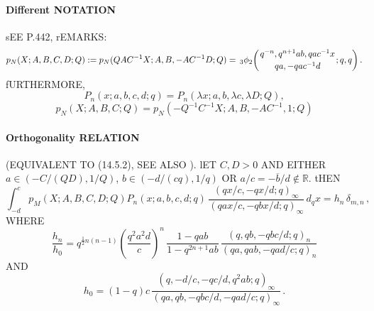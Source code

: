 \documentclass[twoside,11pt]{article}
\newcommand\RR{\mathbb{R}}
\newcommand\de\delta
\newcommand\la\lambda
\newcommand\half{\frac12}
\newcommand\iy\infty
\newcommand{\qhyp}[5]{\,\mbox{}_{#1}\phi_{#2}\!\left( 
  \genfrac{}{}{0pt}{}{#3}{#4};#5\right)}
\begin{document}
\paragraph{Different NOTATION} 
sEE P.442, rEMARKS: 
\begin{equation} 
p_N(X;A,B,C,D;Q):=p_N(QAC^{-1}X;A,B,-AC^{-1}D;Q) 
=\qhyp32{q^{-n},q^{n+1}ab,qac^{-1}x}{qa,-qac^{-1}d}{q,q}. 
\label{123} 
\end{equation} 
fURTHERMORE, 
\begin{equation} 
P_n(x;a,b,c,d;q)=P_n(\la x;a,b,\la c,\la D;Q), 
\label{141} 
\end{equation} 
\begin{equation} 
p_N(X;A,B,C;Q)=p_N(-Q^{-1}C^{-1}X;A,B,-AC^{-1},1;Q) 
\label{142} 
\end{equation} 
% 
\paragraph{Orthogonality RELATION} 
(EQUIVALENT TO (14.5.2), SEE ALSO \cite[(2.42), (2.41), (2.36), (2.35)]{k17}). 
lET $C,D>0$ AND EITHER $a\in (-C/(QD),1/Q)$, $b\in(-d/(cq),1/q)$ OR 
$a/c=-\overline b/d\notin\RR$. tHEN 
\begin{equation} 
\int_{-d}^c p_M(X;A,B,C,D;Q) P_n(x;a,b,c,d;q)\, 
\frac{(qx/c,-qx/d;q)_\iy}{(qax/c,-qbx/d;q)_\iy}\,d_qx=h_n\,\de_{m,n}\,, 
\label{124} 
\end{equation} 
WHERE 
\begin{equation} 
\frac{h_n}{h_0}=q^{\half n(n-1)}\left(\frac{q^2a^2d}c\right)^n\, 
\frac{1-qab}{1-q^{2n+1}ab}\, 
\frac{(q,qb,-qbc/d;q)_n}{(qa,qab,-qad/c;q)_n} 
\label{125} 
\end{equation} 
AND 
\begin{equation} 
h_0=(1-q)c\,\frac{(q,-d/c,-qc/d,q^2ab;q)_\iy} 
{(qa,qb,-qbc/d,-qad/c;q)_\iy}\,. 
\label{126} 
\end{equation} 
% 
\end{document}
